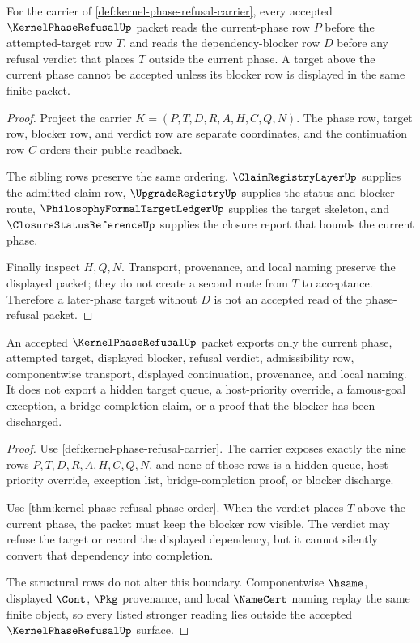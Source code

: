 \begin{theorem}
\label{thm:kernel-phase-refusal-phase-order}
For the carrier of \autoref{def:kernel-phase-refusal-carrier}, every accepted $\KernelPhaseRefusalUp$ packet reads the current-phase row $P$ before the attempted-target row $T$, and reads the dependency-blocker row $D$ before any refusal verdict that places $T$ outside the current phase. A target above the current phase cannot be accepted unless its blocker row is displayed in the same finite packet.
\end{theorem}
\begin{proof}
Project the carrier $K=(P,T,D,R,A,H,C,Q,N)$. The phase row, target row, blocker row, and verdict row are separate coordinates, and the continuation row $C$ orders their public readback.

The sibling rows preserve the same ordering. $\ClaimRegistryLayerUp$ supplies the admitted claim row, $\UpgradeRegistryUp$ supplies the status and blocker route, $\PhilosophyFormalTargetLedgerUp$ supplies the target skeleton, and $\ClosureStatusReferenceUp$ supplies the closure report that bounds the current phase.

Finally inspect $H,Q,N$. Transport, provenance, and local naming preserve the displayed packet; they do not create a second route from $T$ to acceptance. Therefore a later-phase target without $D$ is not an accepted read of the phase-refusal packet.
\end{proof}

\begin{theorem}
\label{thm:kernel-phase-refusal-offtable-boundary}
An accepted $\KernelPhaseRefusalUp$ packet exports only the current phase, attempted target, displayed blocker, refusal verdict, admissibility row, componentwise transport, displayed continuation, provenance, and local naming. It does not export a hidden target queue, a host-priority override, a famous-goal exception, a bridge-completion claim, or a proof that the blocker has been discharged.
\end{theorem}
\begin{proof}
Use \autoref{def:kernel-phase-refusal-carrier}. The carrier exposes exactly the nine rows $P,T,D,R,A,H,C,Q,N$, and none of those rows is a hidden queue, host-priority override, exception list, bridge-completion proof, or blocker discharge.

Use \autoref{thm:kernel-phase-refusal-phase-order}. When the verdict places $T$ above the current phase, the packet must keep the blocker row visible. The verdict may refuse the target or record the displayed dependency, but it cannot silently convert that dependency into completion.

The structural rows do not alter this boundary. Componentwise $\hsame$, displayed $\Cont$, $\Pkg$ provenance, and local $\NameCert$ naming replay the same finite object, so every listed stronger reading lies outside the accepted $\KernelPhaseRefusalUp$ surface.
\end{proof}

